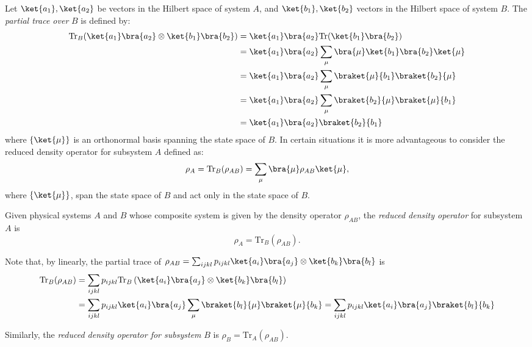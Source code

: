 \begin{definition}
Let \( \ket{a_1}, \ket{a_2} \) be vectors in the Hilbert space of system \( A \), and \( \ket{b_1}, \ket{b_2} \) vectors in the Hilbert space of system \( B \). The \emph{partial trace over} \( B \) is defined by:
\begin{align*}
  \text{Tr}_{B}(\ket{a_1}\bra{a_2} \otimes \ket{b_1}\bra{b_2}) & =\ket{a_1}\bra{a_2}\text{Tr}(\ket{b_1}\bra{b_2}) \\
  & = \ket{a_1}\bra{a_2}  \sum_{\mu} \bra{\mu} \ket{b_1}\bra{b_2} \ket{\mu} \\
  & =  \ket{a_1} \bra{a_2} \sum_{\mu} \braket{\mu} {b_1}\braket{b_2} {\mu} \\
  & = \ket{a_1} \bra{a_2} \sum_{\mu} \braket{b_2}{\mu} \braket{\mu}{b_1} \\
  &= \ket{a_1}\bra{a_2}  \braket{b_2}{b_1}
\end{align*}
where \( \{\ket{\mu}\} \) is an orthonormal basis spanning the state space of \( B \).
In certain situations it is more advantageous to consider the reduced density operator for subsystem $A$ defined as:
\begin{equation*}
  \rho_{A} = \text{Tr}_{B}(\rho_{AB}) = \sum_{\mu} \bra{\mu} \rho_{AB} \ket{\mu},
\end{equation*}
where $\{\ket{\mu}\}$, span the state space of $B$ and act only in the state space of $B$. 
\end{definition}

\begin{definition}
Given physical systems $A$ and $B$ whose composite system is given by the density operator $\rho_{AB}$, the \emph{reduced density operator} for subsystem $A$ is $$\rho_{A} = \text{Tr}_{B}(\rho_{AB}).$$ 

Note that, by linearly, the partial trace of $\rho_{AB} = \sum_{ijkl} p_{ijkl} \ket{a_i} \bra{a_j}  \otimes \ket{b_k} \bra{b_l}$ is
\begin{align*}
  \text{Tr}_{B}(\rho_{AB}) &= \sum_{ijkl} p_{ijkl} \text{Tr}_{B}\left(\ket{a_i}\bra{a_j} \otimes \ket{b_k} \bra{b_l}\right) \\
  & = \sum_{ijkl} p_{ijkl} \ket{a_i}\bra{a_j}  \sum_{\mu} \braket{b_l}{\mu} \braket{\mu}{b_k}= \sum_{ijkl} p_{ijkl} \ket{a_i}\bra{a_j}   \braket{b_l}{b_k} 
\end{align*} 

Similarly, the \emph{reduced density operator for subsystem} $B$ is $\rho_{B} = \text{Tr}_{A}(\rho_{AB})$.
\end{definition}




